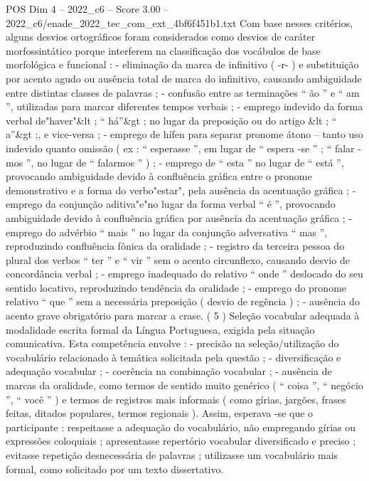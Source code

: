 \begin{textsample}{POS Dim 4 – 2022\_c6 – Score 3.00 – 2022\_c6/enade\_2022\_tec\_com\_ext\_4bf6f451b1.txt}
Com base nesses critérios, alguns desvios ortográficos foram considerados como desvios de caráter morfossintático porque interferem na classificação dos vocábulos de base morfológica e funcional : - eliminação da marca de infinitivo ( -r- ) e substituição por acento agudo ou ausência total de marca do infinitivo, causando ambiguidade entre distintas classes de palavras ; - confusão entre as terminações “ ão ” e “ am ”, utilizadas para marcar diferentes tempos verbais ; - emprego indevido da forma verbal de"haver"\&lt ; “ há”\&gt ; no lugar da preposição ou do artigo \&lt ; “ a”\&gt ;, e vice-versa ; - emprego de hífen para separar pronome átono – tanto uso indevido quanto omissão ( ex : “ esperasse ”, em lugar de “ espera -se ” ; “ falar -mos ”, no lugar de “ falarmos ” ) ; - emprego de “ esta ” no lugar de “ está ”, provocando ambiguidade devido à confluência gráfica entre o pronome demonstrativo e a forma do verbo"estar", pela ausência da acentuação gráfica ; - emprego da conjunção aditiva"e"no lugar da forma verbal “ é ”, provocando ambiguidade devido à confluência gráfica por ausência da acentuação gráfica ; - emprego do advérbio “ mais ” no lugar da conjunção adversativa “ mas ”, reproduzindo confluência fônica da oralidade ; - registro da terceira pessoa do plural dos verbos “ ter ” e “ vir ” sem o acento circunflexo, causando desvio de concordância verbal ; - emprego inadequado do relativo “ onde ” deslocado do seu sentido locativo, reproduzindo tendência da oralidade ; - emprego do pronome relativo “ que ” sem a necessária preposição ( desvio de regência ) ; - ausência do acento grave obrigatório para marcar a crase. ( 5 ) Seleção vocabular adequada à modalidade escrita formal da Língua Portuguesa, exigida pela situação comunicativa.
Esta competência envolve : - precisão na seleção/utilização do vocabulário relacionado à temática solicitada pela questão ; - diversificação e adequação vocabular ; - coerência na combinação vocabular ; - ausência de marcas da oralidade, como termos de sentido muito genérico ( “ coisa ”, “ negócio ”, “ você ” ) e termos de registros mais informais ( como gírias, jargões, frases feitas, ditados populares, termos regionais ).
Assim, esperava -se que o participante : respeitasse a adequação do vocabulário, não empregando gírias ou expressões coloquiais ; apresentasse repertório vocabular diversificado e preciso ; evitasse repetição desnecessária de palavras ; utilizasse um vocabulário mais formal, como solicitado por um texto dissertativo.

\end{textsample}
